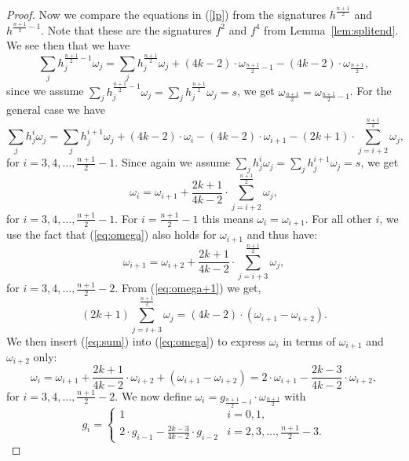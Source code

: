 \documentclass[11pt,a4paper]{article}
\begin{document}
\begin{proof}
Now we compare the equations in (\ref{lp}) from the signatures $h^{\frac{n+1}{2}}$ and $h^{\frac{n+1}{2}-1}$.  Note that these are the signatures $f^2$ and $f^4$ from Lemma~\ref{lem:splitend}. We see then that we have 
\[
\sum_j{h^{\frac{n+1}{2}-1}_j \omega_j}=\sum_j{h^{\frac{n+1}{2}}_j \omega_j} + (4k-2)\cdot\omega_{\frac{n+1}{2}-1} - (4k-2)\cdot\omega_{\frac{n+1}{2}},
\] 
since we assume $\displaystyle{\sum_j{h^{\frac{n+1}{2}-1}_j \omega_j}=\sum_j{h^{\frac{n+1}{2}}_j \omega_j}=s}$, we get $\omega_{\frac{n+1}{2}}=\omega_{\frac{n+1}{2}-1}$.
For the general case we have
\begin{equation}
\sum_j{h^i_j \omega_j}=\sum_j{h^{i+1}_j \omega_j} + (4k-2)\cdot\omega_i - (4k-2)\cdot\omega_{i+1} 
- (2k+1)\cdot\sum_{j=i+2}^{\frac{n+1}{2}}\omega_j,
\end{equation}
for $i = 3,4,\ldots,\frac{n+1}{2}-1$.
Since again we assume $\sum_j{h^i_j \omega_j}=\sum_j{h^{i+1}_j \omega_j}=s$, we get
\begin{equation}
\label{eq:omega}
\omega_i=\omega_{i+1}+\frac{2k+1}{4k-2}\cdot\displaystyle\sum_{j=i+2}^{\frac{n+1}{2}}\omega_j,
\end{equation}
for $i = 3,4,\ldots,\frac{n+1}{2}-1$. For $i=\frac{n+1}{2}-1$ this means $\omega_i=\omega_{i+1}$. For all other $i$, we use the fact that (\ref{eq:omega}) also holds for $\omega_{i+1}$ and thus have:
\begin{equation}
\label{eq:omega+1}
\omega_{i+1}=\omega_{i+2}+\frac{2k+1}{4k-2}\cdot\displaystyle\sum_{j=i+3}^{\frac{n+1}{2}}\omega_j,
\end{equation}
for $i = 3,4,\ldots,\frac{n+1}{2}-2$.
From (\ref{eq:omega+1}) we get,
\begin{equation}
\label{eq:sum}
(2k+1)\sum_{j=i+3}^{\frac{n+1}{2}}\omega_j = (4k-2)\cdot(\omega_{i+1}-\omega_{i+2}).
\end{equation}
We then insert (\ref{eq:sum}) into (\ref{eq:omega}) to express $\omega_i$ in terms of $\omega_{i+1}$ and $\omega_{i+2}$ only:
\begin{equation}
\omega_i = \omega_{i+1}+\frac{2k+1}{4k-2} \cdot \omega_{i+2} + (\omega_{i+1}-\omega_{i+2})
= 2\cdot\omega_{i+1}-\frac{2k-3}{4k-2}\cdot\omega_{i+2},
\end{equation}
for $i = 3,4,\ldots,\frac{n+1}{2}-2$.
We now define $\omega_i = g_{\frac{n+1}{2}-i}\cdot\omega_{\frac{n+1}{2}}$ with
\[
g_i =
\begin{cases}
  1 & i = 0, 1, \\
  2 \cdot g_{i-1}-\frac{2k-3}{4k-2}\cdot g_{i-2} & i = 2, 3, \ldots, \frac{n+1}{2}-3.

\end{cases}\]
\end{proof}
\end{document}
